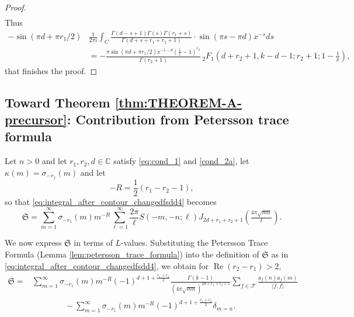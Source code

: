 \documentclass[]{article}
\renewcommand{\Re}{\operatorname{Re}}
\newcommand{\mathcalSsumdef}{\mathfrak{S}}
\newcommand{\kf}[1]{{\color{magenta}{#1}}}
\begin{document}
\begin{proof}
\begin{equation}
\begin{split}
    \end{split}
    \end{equation}
    Thus 
    \begin{equation}
\begin{split}
  -  \sin(\pi d + \pi r_1 / 2)& \frac{1}{2 \pi i}  \int_{C}\frac{   \Gamma(d-s+1)   \Gamma(s) \Gamma(r_1 + s) }{\Gamma (d+s+r_1+r_2+1)  }        \cdot   \sin (\pi s - \pi d)    x^{-s}  ds\\
   & = -     \frac{ \pi \sin(\pi d + \pi r_1 / 2) x^{-1-d}  (\frac{1}{x}-1)^{r_2} }{\Gamma(r_2+1)} \, _2F_1\left(d+r_2+1, k-d-1;r_2+1;1-\frac{1}{x}\right),
\end{split}
\end{equation}
that finishes the proof.
\end{proof}



\subsection{Toward Theorem \ref{thm:THEOREM-A-precursor}: Contribution from Petersson trace formula}\label{sec:petersson}

Let $n>0$ and let $r_1, r_2, d \in \mathbb{C}$ satisfy \eqref{eq:cond_1} and \eqref{cond_2a}, let $\kappa(m) = \sigma_{-r_1}(m)$ and let 
\begin{equation}\label{eq:definition_R}
	-R = \frac{1}{2} (r_1-r_2-1),
\end{equation}
so that \eqref{eq:integral_after_contour_changedfsdd4} becomes
\begin{equation}\label{eq:sum_conv_defined}
        \mathcalSsumdef= 	 \sum_{m=1}^\infty \sigma_{-r_1}(m) m^{-R}  \sum_{\ell=1}^\infty \frac{2 \pi }{\ell} S(-m,-n; \ell)  J_{2d+r_1+r_2+1} ( \tfrac{4 \pi \sqrt{mn}}{\ell}).
\end{equation}





We now express $\mathcalSsumdef$ in terms of $L$-values. Substituting the Petersson Trace Formula (Lemma \ref{lem:petersson_trace_formula}) into the definition of $\mathcalSsumdef$ as in \eqref{eq:integral_after_contour_changedfsdd4},  we obtain for $\Re(r_2-r_1) > 2$,
\begin{equation}
\begin{split}\label{eq:Spetersson1}
        \mathcalSsumdef = &  \sum_{m=1}^\infty \sigma_{-r_1}(m) m^{-R} (-1)^{d+1+\tfrac{r_1+r_2}{2}} \frac{\Gamma(k-1)}{ (4 \pi \sqrt{mn})^{2d+r_1+r_2+1} } \sum_{f \in \mathcal{F}} \frac{a_f(n) \overline{a_f(m)}}{\langle \bar f, \bar f \rangle }   \\ 
         & \ \ \ \ \ \ \ \ \ \ \ \ \ \ \ \ \ \ - \sum_{m=1}^\infty \sigma_{-r_1}(m) m^{-R} (-1)^{d+1+\tfrac{r_1+r_2}{2}} \delta_{m=n}.
\end{split}    
\end{equation}
\end{document}

